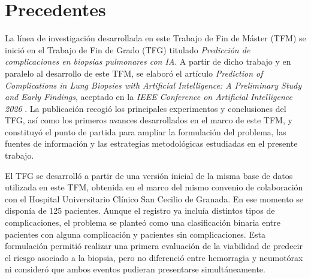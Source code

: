
\section{Precedentes}

La línea de investigación desarrollada en este Trabajo de Fin de Máster (TFM) se inició en el Trabajo de Fin de Grado (TFG) titulado \textit{Predicción de complicaciones en biopsias pulmonares con IA}. A partir de dicho trabajo y en paralelo al desarrollo de este TFM, se elaboró el artículo \textit{Prediction of Complications in Lung Biopsies with Artificial Intelligence: A Preliminary Study and Early Findings}, aceptado en la \textit{IEEE Conference on Artificial Intelligence 2026} \cite{perez2026prediction}. La publicación recogió los principales experimentos y conclusiones del TFG, así como los primeros avances desarrollados en el marco de este TFM, y constituyó el punto de partida para ampliar la formulación del problema, las fuentes de información y las estrategias metodológicas estudiadas en el presente trabajo.

El TFG se desarrolló a partir de una versión inicial de la misma base de datos utilizada en este TFM, obtenida en el marco del mismo convenio de colaboración con el Hospital Universitario Clínico San Cecilio de Granada. En ese momento se disponía de 125 pacientes. Aunque el registro ya incluía distintos tipos de complicaciones, el problema se planteó como una clasificación binaria entre pacientes con alguna complicación y pacientes sin complicaciones. Esta formulación permitió realizar una primera evaluación de la viabilidad de predecir el riesgo asociado a la biopsia, pero no diferenció entre hemorragia y neumotórax ni consideró que ambos eventos pudieran presentarse simultáneamente.

